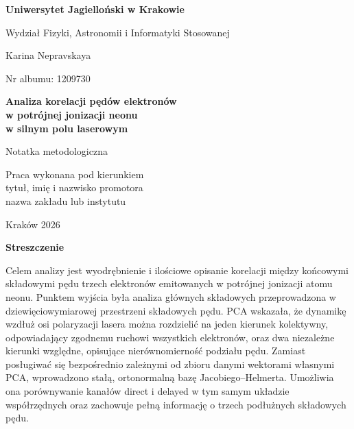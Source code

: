 \documentclass[12pt,letterpaper,oneside]{report}
\numberwithin{equation}{chapter}
\numberwithin{figure}{chapter}
\numberwithin{table}{chapter}
\newcommand{\UniversityName}{Uniwersytet Jagielloński w Krakowie}
\newcommand{\FacultyName}{Wydział Fizyki, Astronomii i Informatyki Stosowanej}
\newcommand{\AlbumNumber}{1209730}
\newcommand{\SupervisorName}{tytuł, imię i nazwisko promotora}
\newcommand{\DepartmentName}{nazwa zakładu lub instytutu}
\newcommand{\YearOfSubmission}{2026}
\begin{document}
\begin{titlepage}
\thispagestyle{empty}

\noindent
{\bfseries \UniversityName}\par
\noindent
\FacultyName

\vspace{2.7cm}

\begin{center}
\centering
\LARGE Karina Nepravskaya

\vspace{0.35cm}
{\large Nr albumu: \AlbumNumber}
\end{center}

\vspace{2.0cm}

\begin{center}
{\LARGE\bfseries
Analiza korelacji pędów elektronów\\[0.2em]
w potrójnej jonizacji neonu\\[0.2em]
w silnym polu laserowym\par}

\vspace{1.2cm}

{\normalsize Notatka metodologiczna}
\end{center}

\vfill

\begin{flushright}
\hfill
\begin{minipage}{0.48\textwidth}
\raggedleft
Praca wykonana pod kierunkiem\\
\SupervisorName\\
\DepartmentName
\end{minipage}
\end{flushright}

\vfill

\begin{center}
Kraków \YearOfSubmission
\end{center}
\end{titlepage}

\setcounter{page}{2}
\tableofcontents
\clearpage
{}
{}
\begin{center}
  {\bfseries Streszczenie}
\end{center}
\vspace{1.2em}

Celem analizy jest wyodrębnienie i ilościowe opisanie korelacji między
końcowymi składowymi pędu trzech elektronów emitowanych w potrójnej
jonizacji atomu neonu. Punktem wyjścia była analiza głównych składowych
przeprowadzona w dziewięciowymiarowej przestrzeni składowych pędu. PCA
wskazała, że dynamikę wzdłuż osi polaryzacji lasera można rozdzielić na
jeden kierunek kolektywny, odpowiadający zgodnemu ruchowi wszystkich
elektronów, oraz dwa niezależne kierunki względne, opisujące
nierównomierność podziału pędu. Zamiast posługiwać się bezpośrednio
zależnymi od zbioru danymi wektorami własnymi PCA, wprowadzono stałą,
ortonormalną bazę Jacobiego--Helmerta. Umożliwia ona porównywanie
kanałów direct i delayed w tym samym układzie współrzędnych oraz
zachowuje pełną informację o trzech podłużnych składowych pędu.
\end{document}
